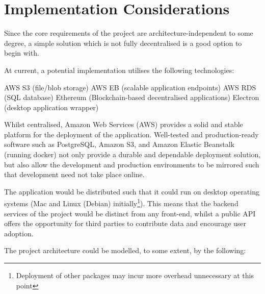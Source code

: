 \section{Implementation Considerations}

Since the core requirements of the project are architecture-independent to some degree, a simple solution which is not fully decentralised is a good option to begin with.

At current, a potential implementation utilises the following technologies:

\begin{outline}
  \1 AWS S3 (file/blob storage)
  \1 AWS EB (scalable application endpoints)
  \1 AWS RDS (SQL database)
  \1 Ethereum (Blockchain-based decentralised applications)
  \1 Electron (desktop application wrapper)
\end{outline}

Whilst centralised, Amazon Web Services (AWS) provides a solid and stable platform for the deployment of the application. Well-tested and production-ready software such as PostgreSQL, Amazon S3, and Amazon Elastic Beanstalk (running docker) not only provide a durable and dependable deployment solution, but also allow the development and production environments to be mirrored such that development need not take place online.

The application would be distributed such that it could run on desktop operating systems (Mac and Linux (Debian) initially\footnote{Deployment of other packages may incur more overhead unnecessary at this point}). This means that the backend services of the project would be distinct from any front-end, whilst a public API offers the opportunity for third parties to contribute data and encourage user adoption.

The project architecture could be modelled, to some extent, by the following:


